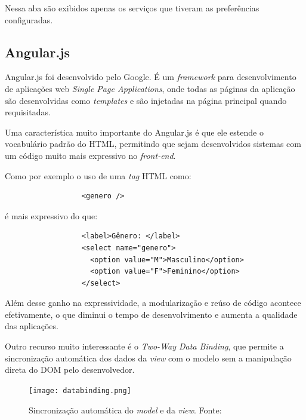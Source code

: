 Nessa aba são exibidos apenas os serviços que tiveram as preferências configuradas.

\subsection{Angular.js}
Angular.js foi desenvolvido pelo Google. É um \textit{framework} para desenvolvimento de aplicações web \textit{Single Page Applications}, onde todas as páginas da aplicação são desenvolvidas como \textit{templates} e são injetadas na página principal quando requisitadas.

Uma característica muito importante do Angular.js é que ele estende o vocabulário padrão do HTML, permitindo que sejam desenvolvidos sistemas com um código muito mais expressivo no \textit{front-end}.

Como por exemplo o uso de uma \textit{tag} HTML como: 
\begin{footnotesize}
  \begin{verbatim}
                  <genero />
  \end{verbatim}
\end{footnotesize}

é mais expressivo do que:

\begin{footnotesize}
  \begin{verbatim}
                  <label>Gênero: </label>
                  <select name="genero">
                    <option value="M">Masculino</option>
                    <option value="F">Feminino</option>
                  </select>
  \end{verbatim}
\end{footnotesize}

Além desse ganho na expressividade, a modularização e reúso de código acontece efetivamente, o que diminui o tempo de desenvolvimento e aumenta a qualidade das aplicações.

Outro recurso muito interessante é o \textit{Two-Way Data Binding}, que permite a sincronização automática dos dados da \textit{view} com o modelo sem a manipulação direta do DOM pelo desenvolvedor.

\begin{figure}[!htb]
  \centering
  \texttt{[image: databinding.png]} %
  \caption[Sincronização automática do \textit{model} e da \textit{view}]{Sincronização automática do \textit{model} e da \textit{view}. Fonte: \cite{angulardb}}
  \label{fig:twoway}
\end{figure}

